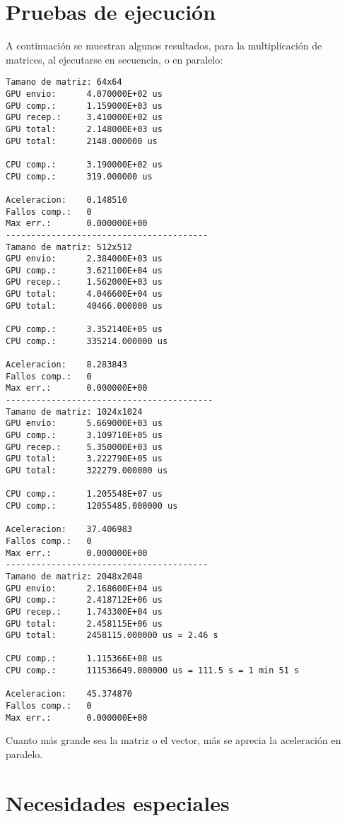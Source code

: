 \documentclass[12pt,a4paper]{article}
\begin{document}
\section{Pruebas de ejecución}
A continuación se muestran algunos resultados, para la multiplicación de matrices, al ejecutarse en secuencia, o en
paralelo:

\begin{lstlisting}
Tamano de matriz: 64x64
GPU envio:      4.070000E+02 us
GPU comp.:      1.159000E+03 us
GPU recep.:     3.410000E+02 us
GPU total:      2.148000E+03 us
GPU total:      2148.000000 us

CPU comp.:      3.190000E+02 us
CPU comp.:      319.000000 us

Aceleracion:    0.148510
Fallos comp.:   0
Max err.:       0.000000E+00
----------------------------------------
Tamano de matriz: 512x512
GPU envio:      2.384000E+03 us
GPU comp.:      3.621100E+04 us
GPU recep.:     1.562000E+03 us
GPU total:      4.046600E+04 us
GPU total:      40466.000000 us

CPU comp.:      3.352140E+05 us
CPU comp.:      335214.000000 us

Aceleracion:    8.283843
Fallos comp.:   0
Max err.:       0.000000E+00
-----------------------------------------
Tamano de matriz: 1024x1024
GPU envio:      5.669000E+03 us
GPU comp.:      3.109710E+05 us
GPU recep.:     5.350000E+03 us
GPU total:      3.222790E+05 us
GPU total:      322279.000000 us

CPU comp.:      1.205548E+07 us
CPU comp.:      12055485.000000 us

Aceleracion:    37.406983
Fallos comp.:   0
Max err.:       0.000000E+00
----------------------------------------
Tamano de matriz: 2048x2048
GPU envio:      2.168600E+04 us
GPU comp.:      2.418712E+06 us
GPU recep.:     1.743300E+04 us
GPU total:      2.458115E+06 us
GPU total:      2458115.000000 us = 2.46 s

CPU comp.:      1.115366E+08 us
CPU comp.:      111536649.000000 us = 111.5 s = 1 min 51 s

Aceleracion:    45.374870
Fallos comp.:   0
Max err.:       0.000000E+00
\end{lstlisting}

Cuanto más grande sea la matriz o el vector, más se aprecia la aceleración en
paralelo.
\section{Necesidades especiales}
\end{document}
